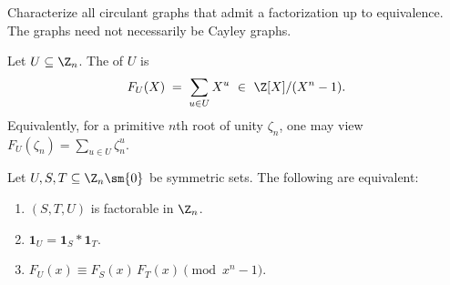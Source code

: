 \documentclass{file}
\begin{document}
\begin{op}
Characterize all circulant graphs that admit a factorization up to equivalence.  
The graphs need not necessarily be Cayley graphs.
\end{op}



\begin{defn}
Let $U\subseteq \Z_n$.
The  of $U$ is
\[
F_U(X)\;=\;\sum_{u\in U} X^{u}\ \in\ \Z[X]/(X^{n}-1).
\]
Equivalently, for a primitive $n$th root of unity $\zeta_n$, one may view $F_U(\zeta_n)=\sum_{u\in U}\zeta_n^{u}$.
\end{defn}

\begin{thm}\label{thm:conv}
Let $U,S,T\subseteq \Z_n\sm\{0\}$ be symmetric sets.
The following are equivalent:
\begin{enumerate}
    \item $(S,T,U)$ is factorable in $\Z_n$.
    \item $\mathbf 1_U=\mathbf 1_S * \mathbf 1_T$.
    \item $F_U(x)\equiv F_S(x)\,F_T(x)\pmod{x^n-1}$.
\end{enumerate}
\end{thm}
\end{document}
